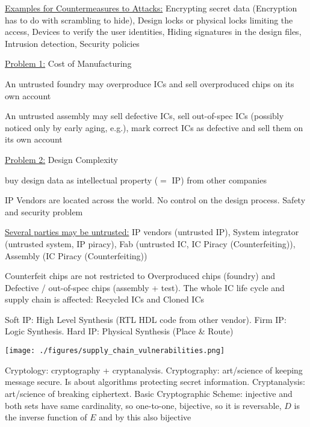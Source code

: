 \documentclass[landscape, a4paper]{article}
\begin{document}
\begin{minipage}[t]{0.2\linewidth}
\begin{betterlist}
		\item \underline{Examples for Countermeasures to Attacks:} Encrypting secret data (Encryption has to do with scrambling to hide), Design locks or physical locks limiting the access, Devices to verify the user identities, Hiding signatures in the design files, Intrusion detection, Security policies
	\end{betterlist}
	\begin{betterlist}
		\item \underline{Problem 1:} Cost of Manufacturing
		\begin{betterlist}
			\item An \alert{untrusted foundry} may overproduce ICs and sell overproduced chips on its own account
			\item An \alert{untrusted assembly} may sell defective ICs, sell out-of-spec ICs (possibly noticed only by early aging, e.g.), mark correct ICs as defective and sell them on its own account
		\end{betterlist}
		\item \underline{Problem 2:} Design Complexity
		\begin{betterlist}
			\item buy design data as \alert{intellectual property} ($=$ \alert{IP}) from other companies
			\item \alert{IP Vendors} are located across the world. No control on the design process. Safety and security problem
		\end{betterlist}
		\item \underline{Several parties may be untrusted:} IP vendors (untrusted IP), System integrator (untrusted system, IP piracy), Fab (untrusted IC, IC Piracy (Counterfeiting)), Assembly (IC Piracy (Counterfeiting))
		\item  \alert{Counterfeit} chips are not restricted to Overproduced chips (foundry) and Defective / out-of-spec chips (assembly + test). The whole IC life cycle and supply chain is affected: \alert{Recycled ICs} and \alert{Cloned ICs}
		\item \alert{Soft IP:} High Level Synthesis (RTL HDL code from other vendor). \alert{Firm IP:} Logic Synthesis. \alert{Hard IP:} Physical Synthesis (Place \& Route)
	\end{betterlist}
	\texttt{[image: ./figures/supply\_chain\_vulnerabilities.png]}
	\fbox{\enquote{Classical} Cryptography}
	\begin{betterlist}
		\item \alert{Cryptology:} cryptography + cryptanalysis. \alert{Cryptography:} art/science of keeping message secure. Is about algorithms protecting secret information. \alert{Cryptanalysis:} art/science of breaking ciphertext. \alert{Basic Cryptographic Scheme:} \alert{injective} and both sets have \alert{same cardinality}, so \alert{one-to-one}, \alert{bijective}, so it is \alert{reversable}, $D$ is the \alert{inverse function} of $E$ and by this also bijective

\end{betterlist}
\end{minipage}
\end{document}
